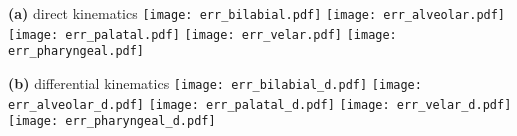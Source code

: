 \documentclass[varwidth=7in]{standalone}
\begin{document}
\raggedright

{\bf (a)} direct kinematics
\texttt{[image: err\_bilabial.pdf]}%
\texttt{[image: err\_alveolar.pdf]}%
\texttt{[image: err\_palatal.pdf]}%
\texttt{[image: err\_velar.pdf]}%
\texttt{[image: err\_pharyngeal.pdf]}

{\bf (b)} differential kinematics
\texttt{[image: err\_bilabial\_d.pdf]}%
\texttt{[image: err\_alveolar\_d.pdf]}%
\texttt{[image: err\_palatal\_d.pdf]}%
\texttt{[image: err\_velar\_d.pdf]}%
\texttt{[image: err\_pharyngeal\_d.pdf]}
\end{document}
